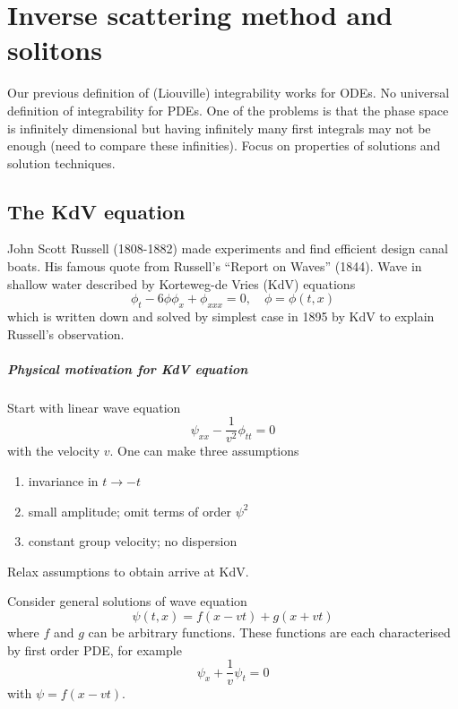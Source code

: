 \chapter{Inverse scattering method and solitons}
Our previous definition of (Liouville) integrability works for ODEs. No universal definition of integrability for PDEs. One of the problems is that the phase space is infinitely dimensional but having infinitely many first integrals may not be enough (need to compare these infinities). Focus on properties of solutions and solution techniques.

\section{The KdV equation}
John Scott Russell (1808-1882) made experiments  and find efficient design canal boats. His famous quote from Russell's ``Report on Waves'' (1844). Wave in shallow water described by Korteweg-de Vries (KdV) equations
\begin{equation}
	\phi_t - 6 \phi \phi_x + \phi_{x x x} = 0, \quad \phi = \phi(t, x)
	\label{math:KdV}
\end{equation}
which is written down and solved by simplest case in 1895 by KdV to explain Russell's observation.

\paragraph{Physical motivation for KdV equation}
Start with linear wave equation 
\begin{equation*}
	\psi_{x x} - \frac{1}{v^2} \phi_{tt} = 0
\end{equation*}
with the velocity $v$. One can make three assumptions
\begin{enumerate}
	\item invariance in $t \rightarrow -t$
	\item small amplitude; omit terms of order $\psi^2$
	\item constant group velocity; no dispersion
\end{enumerate}
Relax assumptions to obtain arrive at KdV.

Consider general solutions of wave equation
\begin{equation*}
	\psi(t, x) = f(x-vt) + g(x+vt)
\end{equation*}
where $f$ and $g$ can be arbitrary functions. These functions are each characterised by first order PDE, for example
\begin{equation*}
	\psi_x + \frac{1}{v} \psi_t = 0
\end{equation*}
with $\psi = f(x-vt)$.

